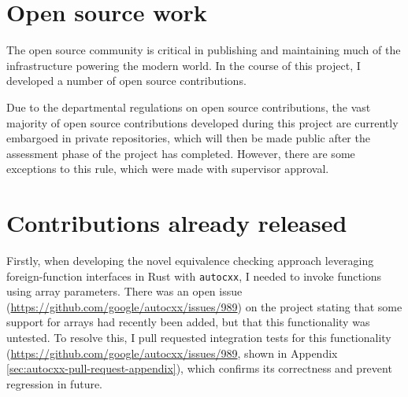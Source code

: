 
\section{Open source work}
\label{sec:open-source-work}

The open source community is critical in publishing and maintaining much of the infrastructure powering the modern world. In the course of this project, I developed a number of open source contributions.

Due to the departmental regulations on open source contributions, the vast majority of open source contributions developed during this project are currently embargoed in private repositories, which will then be made public after the assessment phase of the project has completed. However, there are some exceptions to this rule, which were made with supervisor approval.

\section{Contributions already released}
\label{ssec:open-source-already-released}

Firstly, when developing the novel equivalence checking approach leveraging foreign-function interfaces in Rust with \texttt{autocxx}, I needed to invoke functions using array parameters. There was an open issue (\url{https://github.com/google/autocxx/issues/989}) on the project stating that some support for arrays had recently been added, but that this functionality was untested. To resolve this, I pull requested integration tests for this functionality (\url{https://github.com/google/autocxx/issues/989}, shown in Appendix \ref{sec:autocxx-pull-request-appendix}), which confirms its correctness and prevent regression in future.

